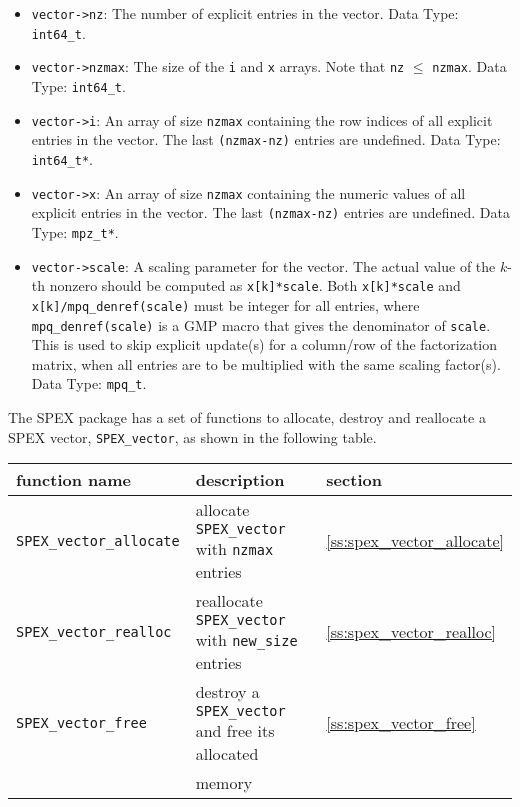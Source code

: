 \documentclass[12pt]{report}
\theoremstyle{definition}
\begin{document}
\begin{itemize}
\item
\verb|vector->nz|: The number of explicit entries in the vector. Data Type: \verb|int64_t|.
\item
\verb|vector->nzmax|: The size of the \verb|i| and \verb|x| arrays. Note that \verb|nz| $\le$ \verb|nzmax|. Data Type: \verb|int64_t|.
\item
\verb|vector->i|: An array of size \verb|nzmax| containing the row indices of all explicit entries in the vector. The last \verb|(nzmax-nz)| entries are undefined. Data Type: \verb|int64_t*|.
\item
\verb|vector->x|: An array of size \verb|nzmax| containing the numeric values of all explicit entries in the vector. The last \verb|(nzmax-nz)| entries are undefined. Data Type: \verb|mpz_t*|.
\item
\verb|vector->scale|: A scaling parameter for the vector. The actual value of the $k$-th nonzero should be computed as \verb|x[k]*scale|. Both  \verb|x[k]*scale| and \verb|x[k]/mpq_denref(scale)| must be integer for all entries, where \verb|mpq_denref(scale)| is a GMP macro that gives the denominator of \verb|scale|. This is used to skip explicit update(s) for a column/row of the factorization matrix, when all entries are to be multiplied with the same scaling factor(s). Data Type: \verb|mpq_t|.
\end{itemize}

The SPEX package has a set of functions to allocate,
destroy and reallocate a SPEX vector, \verb|SPEX_vector|, as shown in the following table.

{\small
\begin{center}
\begin{tabular}{lll}
\hline
function name & description & section \\
\hline
\verb|SPEX_vector_allocate|
    & allocate \verb|SPEX_vector| with \verb|nzmax| entries
    & \ref{ss:spex_vector_allocate} \\
\hline
\verb|SPEX_vector_realloc|
    & reallocate \verb|SPEX_vector| with \verb|new_size| entries
    & \ref{ss:spex_vector_realloc} \\
\hline
\verb|SPEX_vector_free|
    & destroy a \verb|SPEX_vector| and free its allocated
    & \ref{ss:spex_vector_free} \\& memory&\\
\hline
\end{tabular}
\end{center}
}
\end{document}
